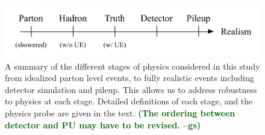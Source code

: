 \documentclass[11pt,letterpaper]{article}
\newcommand{\gs}[1]{\textbf{\textcolor{darkgreen}{(#1 --gs)}}}
\begin{document}
\begin{figure}[t!]
\begin{center}
\includegraphics[width=0.75\columnwidth]{figures/realism_levels}
\end{center}
\caption{A summary of the different stages of physics considered in
  this study from idealized parton level events, to fully realistic
  events including detector simulation and pileup. This allows us to
  address robustness to physics at each stage. Detailed definitions of
  each stage, and the physics probe are given in the text. \gs{The
    ordering between detector and PU may have to be revised.} }
\label{fig:realism}
\end{figure}
\end{document}
